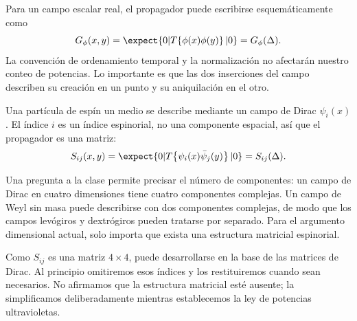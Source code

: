 Para un campo escalar real, el propagador puede escribirse esquemáticamente como
\begin{equation}
G_\phi(x,y)=\expect{0|T\!\left\{\phi(x)\phi(y)\right\}|0}
=G_\phi(\Delta).
\end{equation}
La convención de ordenamiento temporal y la normalización no afectarán nuestro conteo de potencias. Lo importante es que las dos inserciones del campo describen su creación en un punto y su aniquilación en el otro.

\begin{classroomqa}
\end{classroomqa}

Una partícula de espín un medio se describe mediante un campo de Dirac \(\psi_i(x)\). El índice \(i\) es un índice espinorial, no una componente espacial, así que el propagador es una matriz:
\begin{equation}
S_{ij}(x,y)=\expect{0|T\!\left\{\psi_i(x)\bar\psi_j(y)\right\}|0}
=S_{ij}(\Delta).
\end{equation}

Una pregunta a la clase permite precisar el número de componentes: un campo de Dirac en cuatro dimensiones tiene cuatro componentes complejas. Un campo de Weyl sin masa puede describirse con dos componentes complejas, de modo que los campos levógiros y dextrógiros pueden tratarse por separado. Para el argumento dimensional actual, solo importa que exista una estructura matricial espinorial.

Como \(S_{ij}\) es una matriz \(4\times4\), puede desarrollarse en la base de las matrices de Dirac. Al principio omitiremos esos índices y los restituiremos cuando sean necesarios. No afirmamos que la estructura matricial esté ausente; la simplificamos deliberadamente mientras establecemos la ley de potencias ultravioletas.

\begin{classroomqa}
\end{classroomqa}

